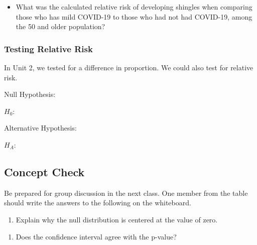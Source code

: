 \documentclass[
]{report}
\providecommand{\tightlist}{%
  \setlength{\itemsep}{0pt}\setlength{\parskip}{0pt}}
\begin{document}
\begin{itemize}
\tightlist
\item
  What was the calculated relative risk of developing shingles when comparing those who has mild COVID-19 to those who had not had COVID-19, among the 50 and older population?
\end{itemize}

\vspace{0.8in}

\subsubsection*{Testing Relative Risk}\label{testing-relative-risk}

In Unit 2, we tested for a difference in proportion. We could also test for relative risk.


Null Hypothesis:

\(H_0:\)

\vspace{0.2in}

Alternative Hypothesis:

\(H_A:\)

\vspace{0.2in}


\subsection{Concept Check}\label{concept-check-6}

Be prepared for group discussion in the next class. One member from the table should write the answers to the following on the whiteboard.

\begin{enumerate}
\def\labelenumi{\arabic{enumi}.}
\tightlist
\item
  Explain why the null distribution is centered at the value of zero.
\end{enumerate}

\vspace{0.5in}

\begin{enumerate}
\def\labelenumi{\arabic{enumi}.}
\setcounter{enumi}{1}
\tightlist
\item
  Does the confidence interval agree with the p-value?
\end{enumerate}
\end{document}

